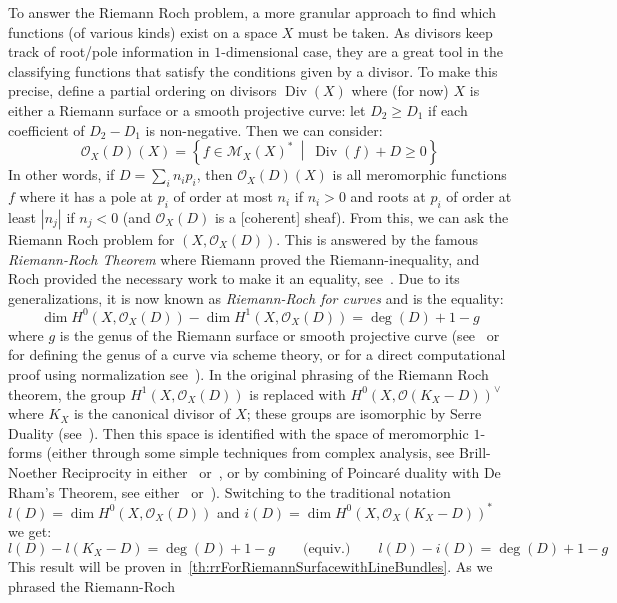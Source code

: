 \documentclass{book}
\newcommand{\CM}{{\mathcal{M}}}
\newcommand{\CO}{{\mathcal{O}}}
\renewcommand{\deg}{{\operatorname{deg}}}
\renewcommand{\div}{{\operatorname{Div}}}
\newcommand{\set}[2]{\left\{#1 \ \middle|\ #2\right\}}
\begin{document}
To answer the Riemann Roch problem, a more granular approach to find which functions (of various kinds) exist
on a space $X$ must be taken. As divisors keep track of root/pole information in $1$-dimensional case, they
are a great tool in the classifying functions that satisfy the conditions given by a divisor. To make
this precise, define a partial ordering on divisors $\div(X)$ where (for now) $X$ is either a Riemann surface
or a smooth projective curve: let $D_2 \ge D_1$ if each coefficient of $D_2 - D_1$ is non-negative. Then we
can consider:
\[
  \CO_X(D)(X) = \set{f \in \CM_X(X)^*}{\div(f) + D \ge 0}
\]
In other words, if $D =\sum_i n_ip_i$, then $\CO_X(D)(X)$ is all meromorphic functions $f$ where it has a pole
at $p_i$ of order at most $n_i$ if $n_i > 0$ and roots at $p_i$ of order at least $|n_j|$ if $n_j < 0$ (and
$\CO_X(D)$ is a [coherent] sheaf). From this, we can ask the Riemann Roch problem for $(X, \CO_X(D))$. This is
answered by the famous \emph{Riemann-Roch Theorem} where Riemann proved the Riemann-inequality, and Roch
provided the necessary work to make it an equality, see~\cite{a.griffithsIntroductionAlgebraicCurves}. Due to
its generalizations, it is now known as \emph{Riemann-Roch for curves} and is the equality:
\begin{equation}\label{eq:riemannRoch1dIntro}
  \dim H^0(X, \CO_X(D)) - \dim H^1(X, \CO_X(D)) = \deg(D)+1-g
\end{equation}
where $g$ is the genus of the Riemann surface or smooth projective curve
(see~\cite{hartshorneAlgebraicGeometry2013} or~\cite{NateAlgGeo} for defining the genus of a curve via scheme
theory, or for a
direct computational proof using normalization see~\cite{NateComplexAnalysis}). In the original phrasing of the Riemann Roch
theorem, the group $H^1(X, \CO_X(D))$ is replaced with $H^0(X, \CO(K_X-D))^\vee$ where $K_X$ is the canonical
divisor of $X$; these groups are isomorphic by Serre Duality (see~\cite[section~6.3]{NateAlgGeo}). Then this
space is identified with the space of meromorphic $1$-forms (either through some simple techniques from
complex analysis, see Brill-Noether Reciprocity in either~\cite{a.griffithsIntroductionAlgebraicCurves}
or~\cite{NateComplexAnalysis}, or by combining of Poincar\'e duality with De Rham's Theorem, see
either~\cite{leeIntroductionRiemannianManifolds2018} or~\cite{NateDiffGeo}). Switching to the traditional
notation $l(D) = \dim H^0(X, \CO_X(D))$ and $i(D) = \dim H^0(X, \CO_X(K_X-D))^*$ we get:
\[
  l(D) - l(K_X-D) = \deg(D) + 1-g \qquad \text{(equiv.)} \qquad l(D) - i(D) = \deg(D) + 1-g
\]
This result will be proven in~\cref{th:rrForRiemannSurfacewithLineBundles}. As we phrased the Riemann-Roch
\end{document}
